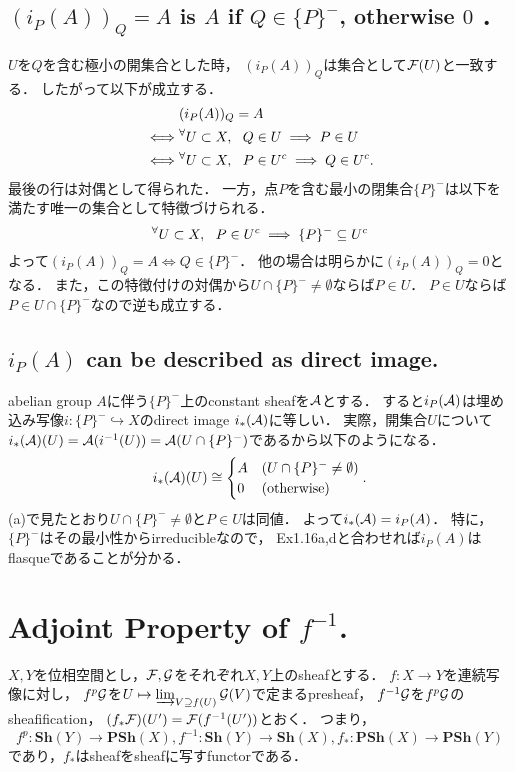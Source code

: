 \documentclass[a4paper]{jsarticle}
\newcommand{\Sh}{\mathbf{Sh}}
\newcommand{\PSh}{\mathbf{PSh}}
\begin{document}
    \subsection{$(i_P(A))_Q=A$ is $A$ if $Q \in \{P\}^-$, otherwise $0$ ．}
    $U$を$Q$を含む極小の開集合とした時，
    $(i_P(A))_Q$は集合として$\mathcal{F}(U)$と一致する．
    したがって以下が成立する．
    \begin{align*}
        {}& (i_P(A))_Q=A \\
        \iff& {}^{\forall} U \subset X,~~ Q \in U \implies P \in U \\
        \iff& {}^{\forall} U \subset X,~~ P \in U^c \implies Q \in U^c.
    \end{align*}
    最後の行は対偶として得られた．
    一方，点$P$を含む最小の閉集合$\{P\}^-$は以下を満たす唯一の集合として特徴づけられる．
    \[ {}^{\forall} U \subset X,~~ P \in U^c \implies \{P\}^- \subseteq U^c \]
    よって$(i_P(A))_Q=A \iff Q \in \{P\}^-$．
    他の場合は明らかに$(i_P(A))_Q=0$となる．
    また，この特徴付けの対偶から$U \cap \{P\}^- \neq \emptyset$ならば$P \in U$．
    $P \in U$ならば$P \in U \cap \{P\}^-$なので逆も成立する．

    \subsection{$i_P(A)$ can be described as direct image.}
    abelian group $A$に伴う$\{P\}^-$上のconstant sheafを$\mathcal{A}$とする．
    すると$i_P(\mathcal{A})$は埋め込み写像$i: \{P\}^- \hookrightarrow X$のdirect image $i_*(\mathcal{A})$に等しい．
    実際，開集合$U$について$i_*(\mathcal{A})(U)=\mathcal{A}(i^{-1}(U))=\mathcal{A}(U \cap \{P\}^-)$であるから以下のようになる．
    \[
        i_*(\mathcal{A})(U) \cong
        \begin{cases}{}
            A & (U \cap \{P\}^- \neq \emptyset) \\
            0 & (\text{otherwise})
        \end{cases}.
    \]
    (a)で見たとおり$U \cap \{P\}^- \neq \emptyset$と$P \in U$は同値．
    よって$i_*(\mathcal{A})=i_P(A)$．
    特に，$\{P\}^-$はその最小性からirreducibleなので，
    Ex1.16a,dと合わせれば$i_P(A)$はflasqueであることが分かる．

\section{Adjoint Property of $f^{-1}$.} %
    $X,Y$を位相空間とし，$\mathcal{F}, \mathcal{G}$をそれぞれ$X,Y$上のsheafとする．
    $f: X \to Y$を連続写像に対し，
    $f^p \mathcal{G}$を$U \mapsto \varinjlim_{V \supseteq f(U)} \mathcal{G}(V)$で定まるpresheaf，
    $f^{-1} \mathcal{G}$を$f^p \mathcal{G}$のsheafification，
    $(f_* \mathcal{F})(U')=\mathcal{F}(f^{-1}(U'))$とおく．
    つまり，
    \[ f^p: \Sh(Y) \to \PSh(X), f^{-1}: \Sh(Y) \to \Sh(X), f_*: \PSh(X) \to \PSh(Y) \]
    であり，$f_*$はsheafをsheafに写すfunctorである．
\end{document}
